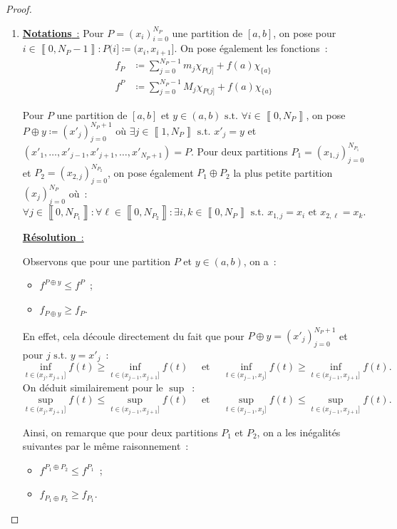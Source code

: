 \documentclass{article}
\newcommand{\st}{\text{ s.t. }}
\newcommand{\intint}[2]{\left\llbracket#1, #2\right\rrbracket}
\begin{document}
\begin{proof}~
\begin{enumerate}
	\item \underline {\textbf {Notations}~:}
	Pour $P = (x_i)_{i=0}^{N_P}$ une partition de $[a, b]$, on pose pour $i \in \intint 0{N_P-1} : P(i] \coloneqq (x_i, x_{i+1}]$. On pose également les fonctions~:
	\begin{align*}
		f_P &\coloneqq \sum_{j=0}^{N_P - 1}m_j\chi_{P(j]} + f(a)\chi_{\{a\}} \\
		f^P &\coloneqq \sum_{j=0}^{N_P - 1}M_j\chi_{P(j]} + f(a)\chi_{\{a\}}
	\end{align*}

	Pour $P$ une partition de $[a, b]$ et $y \in (a, b) \st \forall i \in \intint 0{N_P}$, on pose $P \oplus y \coloneqq (x'_j)_{j=0}^{N_P+1}$ où
	$\exists j \in \intint 1{N_P} \st x'_j = y$ et $(x'_1, \ldots, x'_{j-1}, x'_{j+1}, \ldots, x'_{N_P+1}) = P$. Pour deux partitions
	$P_1 = (x_{1,j})_{j=0}^{N_{P_1}}$ et $P_2 = (x_{2,j})_{j=0}^{N_{P_2}}$, on pose également $P_1 \oplus P_2$ la plus petite partition $(x_j)_{j=0}^{N_P}$ où~:
	\[\forall j \in \intint 0{N_{P_1}} : \forall \ell \in \intint 0{N_{P_2}} : \exists i, k \in \intint 0{N_P}	\st x_{1,j} = x_i \text{ et } x_{2,\ell} = x_k.\]

	\underline {\textbf {Résolution}~:}

	Observons que pour une partition $P$ et $y \in (a, b)$, on a~:
	\begin{itemize}
		\item $f^{P \oplus y} \leq f^P$~;
		\item $f_{P \oplus y} \geq f_P$.
	\end{itemize}

	En effet, cela découle directement du fait que pour $P \oplus y = (x'_j)_{j=0}^{N_P+1}$ et pour $j \st y = x'_j$~:
	\[\inf_{t \in (x_j, x_{j+1}]}f(t) \geq \inf_{t \in (x_{j-1}, x_{j+1}]}f(t) \quad\text{ et }\quad \inf_{t \in (x_{j-1}, x_j]}f(t) \geq \inf_{t \in (x_{j-1}, x_{j+1}]}f(t).\]
	On déduit similairement pour le $\sup$~:
	\[\sup_{t \in (x_j, x_{j+1}]}f(t) \leq \sup_{t \in (x_{j-1}, x_{j+1}]}f(t) \quad\text{ et }\quad \sup_{t \in (x_{j-1}, x_j]}f(t) \leq \sup_{t \in (x_{j-1}, x_{j+1}]}f(t).\]

	Ainsi, on remarque que pour deux partitions $P_1$ et $P_2$, on a les inégalités suivantes par le même raisonnement~:
	\begin{itemize}
		\item $f^{P_1 \oplus P_2} \leq f^{P_1}$~;
		\item $f_{P_1 \oplus P_2} \geq f_{P_1}$.
	\end{itemize}


\end{enumerate}
\end{proof}
\end{document}

